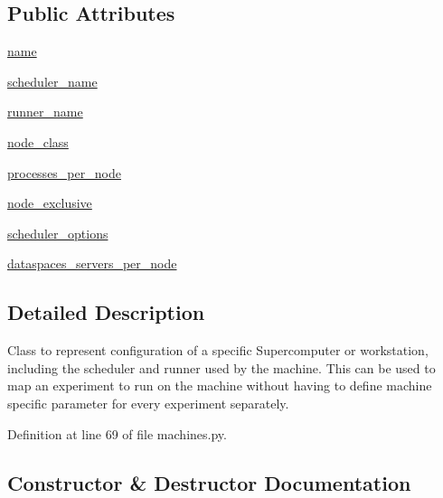 \subsection*{Public Attributes}
\begin{DoxyCompactItemize}
\item 
\hyperlink{classcodar_1_1savanna_1_1machines_1_1_machine_a7d2164c63e076a7240947b1a70e62f0f}{name}
\item 
\hyperlink{classcodar_1_1savanna_1_1machines_1_1_machine_a179ace208a51d849459bf26fcf54acc4}{scheduler\+\_\+name}
\item 
\hyperlink{classcodar_1_1savanna_1_1machines_1_1_machine_a65b17faeda10d83fdd8766430d62815f}{runner\+\_\+name}
\item 
\hyperlink{classcodar_1_1savanna_1_1machines_1_1_machine_ad1f413ae8607221317675adb19a7887a}{node\+\_\+class}
\item 
\hyperlink{classcodar_1_1savanna_1_1machines_1_1_machine_a4b4c0eda863f1003ae7d8bda02f2b96b}{processes\+\_\+per\+\_\+node}
\item 
\hyperlink{classcodar_1_1savanna_1_1machines_1_1_machine_a516048c489dc334f0fe45d529e59c181}{node\+\_\+exclusive}
\item 
\hyperlink{classcodar_1_1savanna_1_1machines_1_1_machine_aa26c50a13e89160894eff5a7fb180ed7}{scheduler\+\_\+options}
\item 
\hyperlink{classcodar_1_1savanna_1_1machines_1_1_machine_a636168243907ca1035c8683a31a69c86}{dataspaces\+\_\+servers\+\_\+per\+\_\+node}
\end{DoxyCompactItemize}


\subsection{Detailed Description}
\begin{DoxyVerb}Class to represent configuration of a specific Supercomputer or
workstation, including the scheduler and runner used by the machine.
This can be used to map an experiment to run on the machine without
having to define machine specific parameter for every experiment
separately.\end{DoxyVerb}
 

Definition at line 69 of file machines.\+py.



\subsection{Constructor \& Destructor Documentation}
\mbox{\label{classcodar_1_1savanna_1_1machines_1_1_machine_a604279a4e666c75e59716eefc01be972}} 

